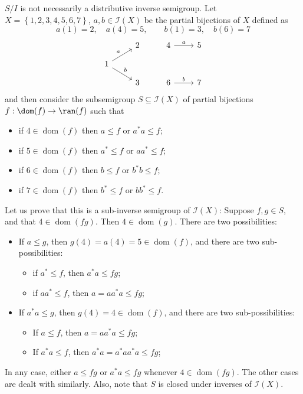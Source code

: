 \begin{example}
$S/I$ is not necessarily a distributive inverse semigroup. Let $X=\left\{1,2,3,4,5,6,7\right\}$, $a,b\in\mathcal{I}(X)$ be the partial bijections of $X$ defined as
\[a(1)=2,\quad a(4)=5,\qquad b(1)=3,\quad b(6)=7\]
\[\begin{tikzcd}[row sep=small]
&2&4\arrow[r,"a"]&5\\
1\arrow[ur,"a"]\arrow[dr,"b"]&&&\\
&3&6\arrow[r,"b"]&7
\end{tikzcd}\]
and then consider the subsemigroup $S\subseteq\mathcal{I}(X)$ of partial bijections $f:\dom(f)\to\ran(f)$ such that
\begin{itemize}
\item if $4\in\operatorname{dom}(f)$ then $a\leq f$ or $a^*a\leq f$;
\item if $5\in\operatorname{dom}(f)$ then $a^*\leq f$ or $aa^*\leq f$;
\item if $6\in\operatorname{dom}(f)$ then $b\leq f$ or $b^*b\leq f$;
\item if $7\in\operatorname{dom}(f)$ then $b^*\leq f$ or $bb^*\leq f$.
\end{itemize}
Let us prove that this is a sub-inverse semigroup of $\mathcal{I}(X)$: Suppose $f,g\in S$, and that $4\in\operatorname{dom}(fg)$. Then $4\in\operatorname{dom}(g)$. There are two possibilities:
\begin{itemize}
\item If $a\leq g$, then $g(4)=a(4)=5\in\operatorname{dom}(f)$, and there are two sub-possibilities:
\begin{itemize}
\item if $a^*\leq f$, then $a^*a\leq fg$;
\item if $aa^*\leq f$, then $a=aa^*a\leq fg$;
\end{itemize}
\item If $a^*a\leq g$, then $g(4)=4\in\operatorname{dom}(f)$, and there are two sub-possibilities:
\begin{itemize}
\item If $a\leq f$, then $a=aa^*a\leq fg$;
\item If $a^*a\leq f$, then $a^*a=a^*aa^*a\leq fg$;
\end{itemize}
\end{itemize}
In any case, either $a\leq fg$ or $a^*a\leq fg$ whenever $4\in\operatorname{dom}(fg)$. The other cases are dealt with similarly. Also, note that $S$ is closed under inverses of $\mathcal{I}(X)$.


\end{example}
